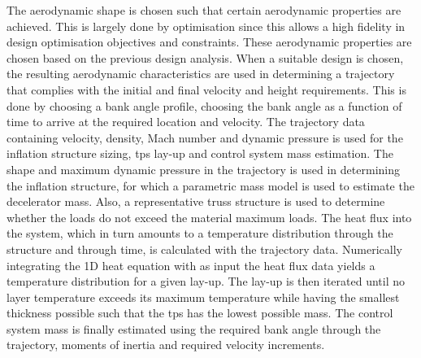The aerodynamic shape is chosen such that certain aerodynamic properties are achieved. This is largely done by optimisation since this allows a high fidelity in design optimisation objectives and constraints. These aerodynamic properties are chosen based on the previous design analysis. 
When a suitable design is chosen, the resulting aerodynamic characteristics are used in determining a trajectory that complies with the initial and final velocity and height requirements. This is done by choosing a bank angle profile, choosing the bank angle as a function of time to arrive at the required location and velocity. 
The trajectory data containing velocity, density, Mach number and dynamic pressure is used for the inflation structure sizing, \gls{tps} lay-up and control system mass estimation. The shape and maximum dynamic pressure in the trajectory is used in determining the inflation structure, for which a parametric mass model is used to estimate the decelerator mass. 
Also, a representative truss structure is used to determine whether the loads do not exceed the material maximum loads. The heat flux into the system, which in turn amounts to a temperature distribution through the structure and through time, is calculated with the trajectory data. Numerically integrating the 1D heat equation with as input the heat flux data yields a temperature distribution for a given lay-up. The lay-up is then iterated until no layer temperature exceeds its maximum temperature while having the smallest thickness possible such that the \gls{tps} has the lowest possible mass. 
The control system mass is finally estimated using the required bank angle through the trajectory, moments of inertia and required velocity increments.

